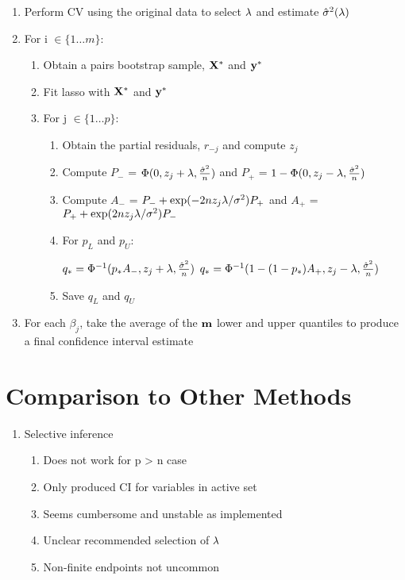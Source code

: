 \begin{enumerate}
\item Perform CV using the original data to select $\lambda$ and estimate $\hat{\sigma}^2(\lambda)$
\item For i $\in \lbrace 1 \ldots m \rbrace$:
\begin{enumerate}
\item Obtain a pairs bootstrap sample, $\mathbf{X}^*$ and $\mathbf{y}^*$
\item Fit lasso with $\mathbf{X}^*$ and $\mathbf{y}^*$
\item For j $\in \lbrace 1 \ldots p \rbrace$:
	\begin{enumerate}
	\item Obtain the partial residuals, $r_{-j}$ and compute $z_j$
	\item Compute $P_{-}$ = $\Phi(0, z_j + \lambda, \frac{\hat{\sigma}^2}{n})$ and $P_{+}$ = $1 - \Phi(0, z_j - \lambda, \frac{\hat{\sigma}^2}{n})$
	\item Compute $A_{-}$ = $P_{-} + \exp(-2n z_j \lambda / \sigma^2)P_{+}$ and $A_{+}$ = $P_{+} + \exp(2n z_j \lambda / \sigma^2)P_{-}$
	\item For $p_L$ and $p_U$:
	\begin{algorithmic}
			\State $q_* = \Phi^{-1}(p_* A_{-}, z_j + \lambda, \frac{\hat{\sigma}^2}{n})$
		\Else
			\State $q_* = \Phi^{-1}(1 - (1 - p_*)A_{+}, z_j - \lambda, \frac{\hat{\sigma}^2}{n})$
		\EndIf
	\end{algorithmic}
	\item Save $q_L$ and $q_U$
	\end{enumerate}
\end{enumerate}
\item For each $\beta_j$, take the average of the $\mathbf{m}$ lower and upper quantiles to produce a final confidence interval estimate
\end{enumerate}

\section{Comparison to Other Methods}

\begin{enumerate}
\item Selective inference
\begin{enumerate}
\item Does not work for p > n case
\item Only produced CI for variables in active set
\item Seems cumbersome and unstable as implemented
\item Unclear recommended selection of $\lambda$
\item Non-finite endpoints not uncommon
\end{enumerate}
\end{enumerate}


